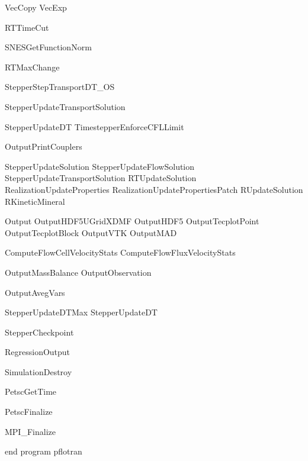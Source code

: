 			VecCopy
			VecExp
			
			RTTimeCut
			
			SNESGetFunctionNorm
			
			RTMaxChange
			
		StepperStepTransportDT_OS
	
		StepperUpdateTransportSolution
	
		StepperUpdateDT
		TimestepperEnforceCFLLimit
	
		OutputPrintCouplers
		
		StepperUpdateSolution
			StepperUpdateFlowSolution
			StepperUpdateTransportSolution
				RTUpdateSolution
				RealizationUpdateProperties
					RealizationUpdatePropertiesPatch
						RUpdateSolution
							RKineticMineral
	
		Output
			OutputHDF5UGridXDMF
			OutputHDF5
			OutputTecplotPoint
			OutputTecplotBlock
			OutputVTK
			OutputMAD
			
			ComputeFlowCellVelocityStats
			ComputeFlowFluxVelocityStats
			
			OutputMassBalance
			OutputObservation
			
			OutputAvegVars
			
		StepperUpdateDTMax
		StepperUpdateDT
	
		StepperCheckpoint

	RegressionOutput

	SimulationDestroy

	PetscGetTime

	PetscFinalize

	MPI_Finalize

end program pflotran
